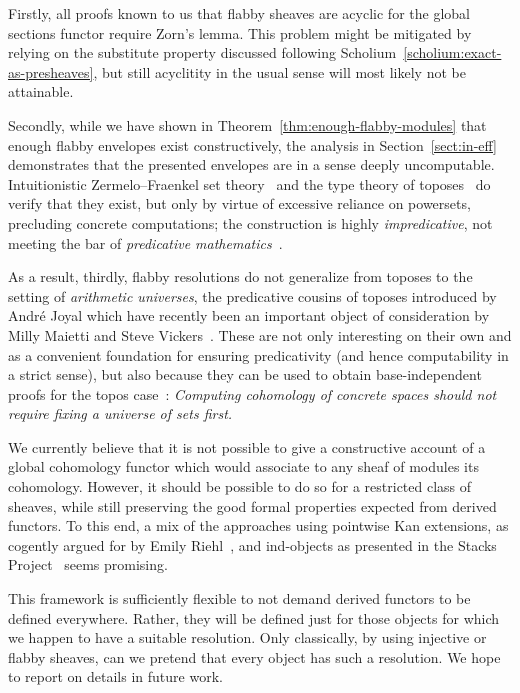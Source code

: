 \documentclass[oneside]{amsart}
\theoremstyle{definition}
\theoremstyle{plain}
\theoremstyle{remark}
\renewcommand{\_}{\mathpunct{.}\,}
\begin{document}
Firstly, all proofs known to us that flabby sheaves are
acyclic for the global sections functor require Zorn's lemma. This problem might
be mitigated by relying on the substitute property discussed
following Scholium~\ref{scholium:exact-as-presheaves}, but still acyclitity in
the usual sense will most likely not be attainable.

Secondly, while we have shown in Theorem~\ref{thm:enough-flabby-modules} that
enough flabby envelopes exist constructively, the analysis in Section~\ref{sect:in-eff}
demonstrates that the presented envelopes are in a sense deeply uncomputable.
Intuitionistic Zermelo--Fraenkel set theory~\cite{crosilla:cst-izf} and the
type theory of toposes~\cite{maietti:modular} do verify that they exist, but
only by virtue of excessive reliance on powersets, precluding concrete
computations; the construction is highly \emph{impredicative}, not meeting the
bar of \emph{predicative mathematics}~\cite{crosilla:predicativity}.

As a result, thirdly, flabby resolutions do not generalize from toposes to the
setting of \emph{arithmetic universes}, the predicative cousins of toposes
introduced by André Joyal which have recently been an important object of
consideration by Milly Maietti and
Steve Vickers~\cite{maietti:au,maietti-vickers:induction,vickers:sketches}.
These are not only interesting on their own and as a convenient foundation
for ensuring predicativity (and hence computability in a strict sense), but also
because they can be used to obtain base-independent proofs for the topos
case~\cite{vickers:classifying,hazratpour:phd}: \emph{Computing cohomology of
concrete spaces should not require fixing a universe of sets first.}

We currently believe that it is not possible to give a constructive account of
a global cohomology functor which would associate to any sheaf of modules its
cohomology. However, it should be possible to do so for a restricted class of
sheaves, while still preserving the good formal properties expected from
derived functors. To this end, a mix of the approaches using
pointwise Kan extensions, as cogently argued for by Emily
Riehl~\cite[Chapter~2]{riehl:cathtpy}, and ind-objects as presented in the Stacks
Project~\cite[Tag~05S7]{stacks-project} seems promising.

This framework is sufficiently flexible to not demand derived functors to be
defined everywhere. Rather, they will be defined just for those objects for
which we happen to have a suitable resolution. Only classically, by using
injective or flabby sheaves, can we pretend that every object has such a
resolution. We hope to report on details in future work.

\printbibliography
\enlargethispage{1em}
\end{document}
